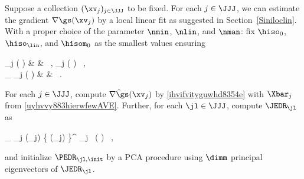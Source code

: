 Suppose a collection \( (\xv_{j})_{j \in \JJJ} \) to be fixed.
For each \( j \in \JJJ \), we can estimate the gradient \( \nabla \gs(\xv_{j}) \) 
by a local linear fit as suggested in Section~\ref{Siniloclin}.
With a proper choice of the parameter \( \nmin \), \( \nlin \), and \( \nman \):
fix \( \hiso_{0} \), \( \hiso_{\lin} \), and \( \hisom_{0} \) as the smallest values ensuring 
\begin{EQ}[rcl]
	\sum_{j \in \JJJ} 
	\sumi \Kern\Bigl(  \Bigr)
	& \geq &
	\nmin
	\, ,
	\quad
	 \sum_{j \in \JJJ} 
	\sumi \Kern\Bigl(  \Bigr)
	\geq 
	\nlin
	\, ,
	\\
	 \sum_{\jl \in \JJJ} 
	\sum_{j \in \JJJ} \Kern\Bigl(  \Bigr)
	& \geq &
	\nman
	\, .
\label{hhfiecredgvhihiue86tML}
\end{EQ}
For each \( j \in \JJJ \), compute \( \hat{\nabla \gs}(\xv_{j}) \) by \eqref{ihvifvityguwhd8354e}
with \( \Xbar_{j} \) from \eqref{uyhvvy883hierwfewAVE}.
Further, for each \( \jl \in \JJJ \), compute \( \JEDR_{\jl} \) as
\begin{EQA}[c]
	\JEDR_{\jl}
	\eqdef
	\sum_{j \in \JJJ} \hat{\nabla \gs}(\xv_{j}) \bigl\{ \hat{\nabla \gs}(\xv_{j}) \bigr\}^{\T} \neff_{j} \, 
	\Kern\Bigl(  \Bigr)
	\, ,
\label{jheew3regdw3bvio2ff}
\end{EQA}
and initialize \( \PEDR_{\jl,\init} \) by a PCA procedure using \( \dimm \) principal eigenvectors of \( \JEDR_{\jl} \).  


